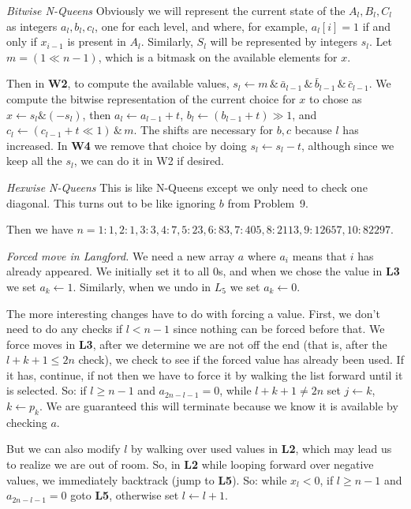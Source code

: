  {\it Bitwise N-Queens}\hfil\break
Obviously we will represent the current state of the $A_l, B_l, C_l$ 
as integers $a_l, b_l, c_l$, one for each level, and where, for example, 
$a_l\left[i\right] = 1$ if and only if $x_{i-1}$ is present in $A_l$.  
Similarly, $S_l$ will be represented by integers $s_l$.  Let 
$m = \left(1 \ll {n-1}\right)$, which is a bitmask on the available elements
for $x$.

Then in {\bf W2}, to compute the available values,
$s_l \leftarrow m \,\&\, {\bar a_{l-1}} \,\&\, {\bar b_{l-1}} \,\&\, 
{\bar c_{l-1}}$. We compute the bitwise representation of the current choice 
for $x$ to chose as $x \leftarrow s_l \& \left(- s_l\right)$, then 
$a_l \leftarrow a_{l-1} + t$, $b_l \leftarrow \left(b_{l-1} + t\right) \gg 1$, 
and  $c_l \leftarrow \left( {c_{l-1} + t} \ll 1 \right) \,\&\, m$.  The shifts 
are necessary for $b, c$ because $l$ has increased.  In {\bf W4} we
remove that choice by doing $s_l \leftarrow s_l - t$, although since we keep
all the $s_l$, we can do it in W2 if desired.

 {\it Hexwise N-Queens}\hfil\break
This is like N-Queens except we only need to check one diagonal.  This turns out
to be like ignoring $b$ from Problem~9.

Then we have $n=1: 1, 2: 1, 3: 3, 4: 7, 5: 23, 6: 83, 7: 405, 8: 2113, 9: 12657,
10: 82297$.

 {\it Forced move in Langford.}\hfil\break
We need a new array $a$ where $a_i$ means that $i$ has already appeared.
We initially set it to all 0s, and when we chose the value in {\bf L3}
we set $a_k \leftarrow 1$.  Similarly, when we undo in $L_5$ we set
$a_k \leftarrow 0$.

The more interesting changes have to do with forcing a value.  First,
we don't need to do any checks if $l < n - 1$ since nothing can be forced
before that.  We force moves in {\bf L3}, after we determine we are not
off the end (that is, after the $l + k + 1 \le 2 n$ check), we check to see 
if the forced value has already been used.  If it has, continue, if not
then we have to force it by walking the list forward until it is selected.
So: if $l \ge n - 1$ and $a_{2n - l - 1} = 0$, while $l + k + 1 \ne 2 n$
set $j \leftarrow k$, $k \leftarrow p_k$.  We are guaranteed this will
terminate because we know it is available by checking $a$.

But we can also modify $l$ by walking over used values in {\bf L2}, which
may lead us to realize we are out of room.  So, in {\bf L2} while looping
forward over negative values, we immediately backtrack (jump to {\bf L5}).
So: while $x_l < 0$, if $l \ge n - 1$ and $a_{2 n - l - 1} = 0$ goto {\bf L5},
otherwise set $l \leftarrow l + 1$.


